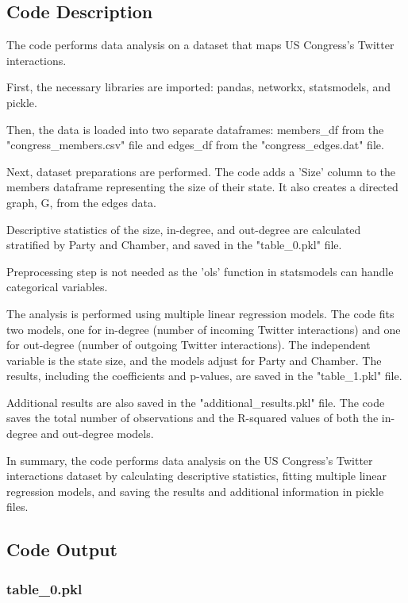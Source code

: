 \documentclass[11pt]{article}
\begin{document}
\subsection{Code Description}

The code performs data analysis on a dataset that maps US Congress's Twitter interactions. 

First, the necessary libraries are imported: pandas, networkx, statsmodels, and pickle.

Then, the data is loaded into two separate dataframes: members\_df from the "congress\_members.csv" file and edges\_df from the "congress\_edges.dat" file.

Next, dataset preparations are performed. The code adds a 'Size' column to the members dataframe representing the size of their state. It also creates a directed graph, G, from the edges data.

Descriptive statistics of the size, in-degree, and out-degree are calculated stratified by Party and Chamber, and saved in the "table\_0.pkl" file.

Preprocessing step is not needed as the 'ols' function in statsmodels can handle categorical variables.

The analysis is performed using multiple linear regression models. The code fits two models, one for in-degree (number of incoming Twitter interactions) and one for out-degree (number of outgoing Twitter interactions). The independent variable is the state size, and the models adjust for Party and Chamber. The results, including the coefficients and p-values, are saved in the "table\_1.pkl" file.

Additional results are also saved in the "additional\_results.pkl" file. The code saves the total number of observations and the R-squared values of both the in-degree and out-degree models.

In summary, the code performs data analysis on the US Congress's Twitter interactions dataset by calculating descriptive statistics, fitting multiple linear regression models, and saving the results and additional information in pickle files.

\subsection{Code Output}

\subsubsection*{table\_0.pkl}
\end{document}
